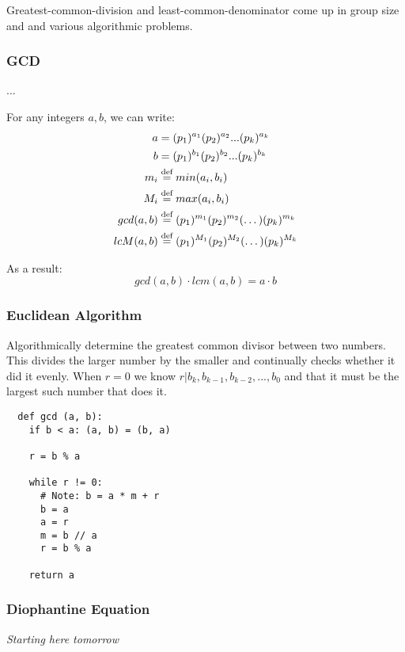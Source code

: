 \documentclass{article}
\begin{document}
Greatest-common-division and least-common-denominator come up in group size and
and various algorithmic problems.

\pagebreak
\subsubsection{GCD}

...

For any integers $a, b$, we can write:
  \begin{align*}
    a   & = (p_1)^{a_1} (p_2)^{a_2} ... (p_k)^{a_k}     \\
    b   & = (p_1)^{b_1} (p_2)^{b_2} ... (p_k)^{b_k}     \\
    m_i & \stackrel{\text{def}}{=} min(a_i, b_i)                          \\
    M_i & \stackrel{\text{def}}{=} max(a_i, b_i)                          \\
    gcd(a, b) & \stackrel{\text{def}}{=} (p_1)^{m_1} (p_2)^{m_2} (\dots) (p_k)^{m_k} \\
    lcM(a, b) & \stackrel{\text{def}}{=} (p_1)^{M_1} (p_2)^{M_2} (\dots) (p_k)^{M_k} \\
  \end{align*}

As a result:
  $$ gcd(a, b) \cdot lcm(a, b) = a \cdot b $$

\subsubsection{Euclidean Algorithm}

Algorithmically determine the greatest common divisor between two numbers. This
divides the larger number by the smaller and continually checks whether it did
it evenly. When $r = 0$ we know $ r | b_k, b_{k-1}, b_{k-2}, ..., b_0 $ and that
it must be the largest such number that does it.

\begin{verbatim}
  def gcd (a, b):
    if b < a: (a, b) = (b, a)

    r = b % a

    while r != 0:
      # Note: b = a * m + r
      b = a
      a = r
      m = b // a
      r = b % a

    return a
\end{verbatim}

\subsubsection{Diophantine Equation}

\emph{Starting here tomorrow}
\end{document}
